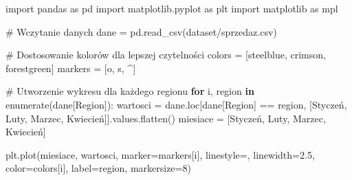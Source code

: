 \documentclass[
  polish,
  letterpaper,
  DIV=11,
  numbers=noendperiod]{scrreprt}
\newenvironment{Shaded}{\begin{snugshade}}{\end{snugshade}}
\newcommand{\BuiltInTok}[1]{\textcolor[rgb]{0.00,0.23,0.31}{#1}}
\newcommand{\CommentTok}[1]{\textcolor[rgb]{0.37,0.37,0.37}{#1}}
\newcommand{\ControlFlowTok}[1]{\textcolor[rgb]{0.00,0.23,0.31}{\textbf{#1}}}
\newcommand{\DecValTok}[1]{\textcolor[rgb]{0.68,0.00,0.00}{#1}}
\newcommand{\FloatTok}[1]{\textcolor[rgb]{0.68,0.00,0.00}{#1}}
\newcommand{\ImportTok}[1]{\textcolor[rgb]{0.00,0.46,0.62}{#1}}
\newcommand{\KeywordTok}[1]{\textcolor[rgb]{0.00,0.23,0.31}{\textbf{#1}}}
\newcommand{\NormalTok}[1]{\textcolor[rgb]{0.00,0.23,0.31}{#1}}
\newcommand{\OperatorTok}[1]{\textcolor[rgb]{0.37,0.37,0.37}{#1}}
\newcommand{\StringTok}[1]{\textcolor[rgb]{0.13,0.47,0.30}{#1}}
\begin{document}
\begin{Shaded}
\begin{Highlighting}[]
\ImportTok{import}\NormalTok{ pandas }\ImportTok{as}\NormalTok{ pd}
\ImportTok{import}\NormalTok{ matplotlib.pyplot }\ImportTok{as}\NormalTok{ plt}
\ImportTok{import}\NormalTok{ matplotlib }\ImportTok{as}\NormalTok{ mpl}

\CommentTok{\# Wczytanie danych}
\NormalTok{dane }\OperatorTok{=}\NormalTok{ pd.read\_csv(}\StringTok{\textquotesingle{}dataset/sprzedaz.csv\textquotesingle{}}\NormalTok{)}


\CommentTok{\# Dostosowanie kolorów dla lepszej czytelności}
\NormalTok{colors }\OperatorTok{=}\NormalTok{ [}\StringTok{\textquotesingle{}steelblue\textquotesingle{}}\NormalTok{, }\StringTok{\textquotesingle{}crimson\textquotesingle{}}\NormalTok{, }\StringTok{\textquotesingle{}forestgreen\textquotesingle{}}\NormalTok{]}
\NormalTok{markers }\OperatorTok{=}\NormalTok{ [}\StringTok{\textquotesingle{}o\textquotesingle{}}\NormalTok{, }\StringTok{\textquotesingle{}s\textquotesingle{}}\NormalTok{, }\StringTok{\textquotesingle{}\^{}\textquotesingle{}}\NormalTok{]}

\CommentTok{\# Utworzenie wykresu dla każdego regionu}
\ControlFlowTok{for}\NormalTok{ i, region }\KeywordTok{in} \BuiltInTok{enumerate}\NormalTok{(dane[}\StringTok{\textquotesingle{}Region\textquotesingle{}}\NormalTok{]):}
\NormalTok{    wartosci }\OperatorTok{=}\NormalTok{ dane.loc[dane[}\StringTok{\textquotesingle{}Region\textquotesingle{}}\NormalTok{] }\OperatorTok{==}\NormalTok{ region, [}\StringTok{\textquotesingle{}Styczeń\textquotesingle{}}\NormalTok{, }\StringTok{\textquotesingle{}Luty\textquotesingle{}}\NormalTok{, }\StringTok{\textquotesingle{}Marzec\textquotesingle{}}\NormalTok{, }\StringTok{\textquotesingle{}Kwiecień\textquotesingle{}}\NormalTok{]].values.flatten()}
\NormalTok{    miesiace }\OperatorTok{=}\NormalTok{ [}\StringTok{\textquotesingle{}Styczeń\textquotesingle{}}\NormalTok{, }\StringTok{\textquotesingle{}Luty\textquotesingle{}}\NormalTok{, }\StringTok{\textquotesingle{}Marzec\textquotesingle{}}\NormalTok{, }\StringTok{\textquotesingle{}Kwiecień\textquotesingle{}}\NormalTok{]}

\NormalTok{    plt.plot(miesiace, wartosci, marker}\OperatorTok{=}\NormalTok{markers[i], linestyle}\OperatorTok{=}\StringTok{\textquotesingle{}{-}\textquotesingle{}}\NormalTok{, linewidth}\OperatorTok{=}\FloatTok{2.5}\NormalTok{,}
\NormalTok{             color}\OperatorTok{=}\NormalTok{colors[i], label}\OperatorTok{=}\NormalTok{region, markersize}\OperatorTok{=}\DecValTok{8}\NormalTok{)}


\end{Highlighting}
\end{Shaded}
\end{document}
